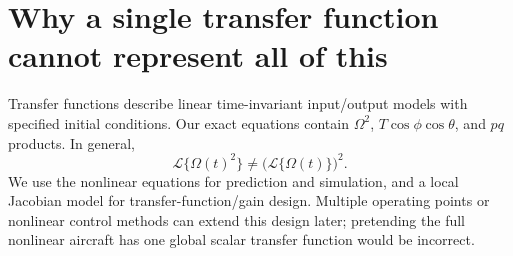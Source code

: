 
\section{Why a single transfer function cannot represent all of this}
Transfer functions describe linear time-invariant input/output models with
specified initial conditions. Our exact equations contain $\Omega^2$,
$T\cos\phi\cos\theta$, and $pq$ products. In general,
\begin{equation}
\mathcal L\{\Omega(t)^2\}\ne\bigl(\mathcal L\{\Omega(t)\}\bigr)^2.
\end{equation}
We use the nonlinear equations for prediction and simulation, and a local
Jacobian model for transfer-function/gain design. Multiple operating points or
nonlinear control methods can extend this design later; pretending the full
nonlinear aircraft has one global scalar transfer function would be incorrect.
